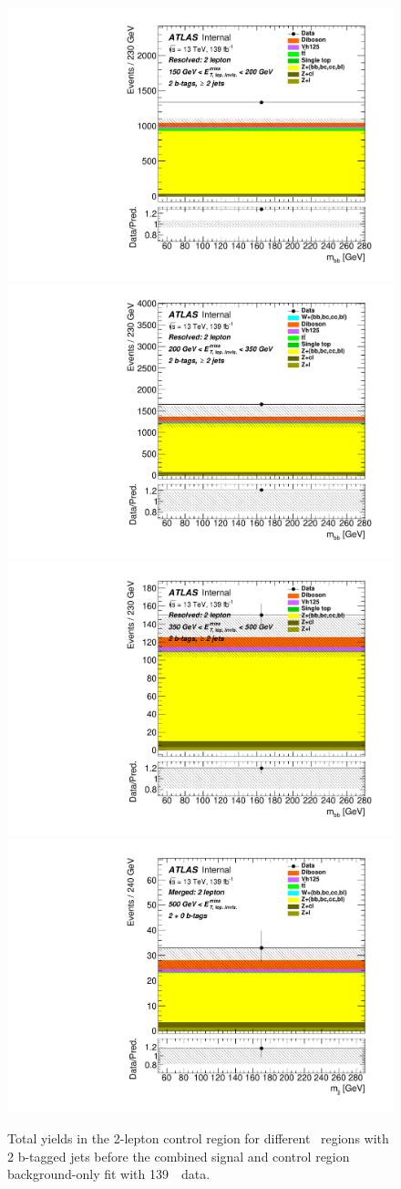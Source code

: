 \begin{figure}[H]
  \includegraphics[width=0.46\linewidth]{chapters/c9/figures/Region_distmBB_J2_L2_T2_DCR2_Y2015_incJet1_Fat0_incFat1_BMin150_BMax200_Prefit.pdf}
  \includegraphics[width=0.46\linewidth]{chapters/c9/figures/Region_distmBB_J2_L2_T2_DCR2_Y2015_incJet1_Fat0_incFat1_BMin200_BMax350_Prefit.pdf}\\
  \includegraphics[width=0.46\linewidth]{chapters/c9/figures/Region_distmBB_J2_L2_T2_DCR2_Y2015_incJet1_Fat0_incFat1_BMin350_BMax500_Prefit.pdf}
  \includegraphics[width=0.46\linewidth]{chapters/c9/figures/Region_BMin500_incFat1_Fat1_incJet1_Y2015_DCR2_T20_L2_distmBB_J0_Prefit.pdf}
\caption{Total yields in the 2-lepton control region for different \met~regions with \\2 b-tagged jets before the combined signal and control region background-only fit with 139~\ifb~data.}
\label{fig:Data_MC_CR2_ll_m_jj_2b}
\end{figure}

